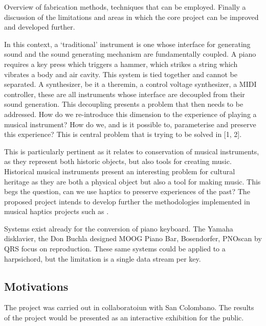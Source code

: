 Overview of fabrication methods, techniques that can be employed.
Finally a discussion of the limitations and areas in which the core
project can be improved and developed further.

In this context, a `traditional' instrument is one whose interface for
generating sound and the sound generating mechanism are fundamentally
coupled. A piano requires a key press which triggers a hammer, which
strikes a string which vibrates a body and air cavity. This system is
tied together and cannot be separated. A synthesizer, be it a theremin,
a control voltage synthesizer, a MIDI controller, these are all
instruments whose interface are decoupled from their sound generation.
This decoupling presents a problem that then needs to be addressed. How
do we re-introduce this dimension to the experience of playing a musical
instrument? How do we, and is it possible to, parameterise and preserve
this experience? This is central problem that is trying to be solved in
{[}1, 2{]}.

This is particularly pertinent as it relates to conservation of musical
instruments, as they represent both historic objects, but also tools for
creating music. Historical musical instruments present an interesting
problem for cultural heritage as they are both a physical object but
also a tool for making music. This begs the question, can we use haptics
to preserve experiences of the past? The proposed project intends to
develop further the methodologies implemented in musical haptics
projects \cite{MusicalHaptics2018} such as \cite{Timmermans2020}.

Systems exist already for the conversion of piano keyboard. The Yamaha
disklavier, the Don Buchla designed MOOG Piano Bar, Bosendorfer, PNOscan
by QRS focus on reproduction. These same systems could be applied to a
harpsichord, but the limitation is a single data stream per key.

\subsection{Motivations}\label{motivations}

The project was carried out in collaboratoiun with San Colombano. The
results of the project would be presented as an interactive exhibition
for the public.

